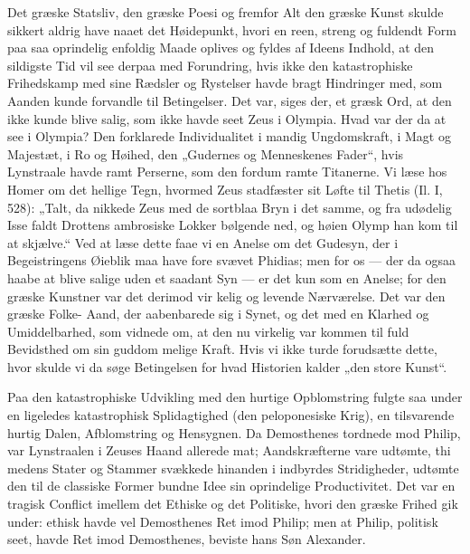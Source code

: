 \documentclass[12pt]{book}
\newcommand{\opage}[1]{\marginnote{\footnotesize\textit{[#1]}}}
\begin{document}
Det græske Statsliv, den græske Poesi og fremfor
Alt den græske Kunst skulde sikkert aldrig have naaet
det Høidepunkt, hvori en reen, streng og fuldendt Form
paa saa oprindelig enfoldig Maade oplives og fyldes af
Ideens Indhold, at den sildigste Tid vil see derpaa med
Forundring, hvis ikke den katastrophiske Frihedskamp
med sine Rædsler og Rystelser havde bragt Hindringer
med, som Aanden kunde forvandle til Betingelser. Det
var, siges der, et græsk Ord, at den ikke kunde blive
salig, som ikke havde seet Zeus i Olympia. Hvad var
der da at see i Olympia? Den forklarede Individualitet
i mandig Ungdomskraft, i Magt og Majestæt, i Ro og
Høihed, den „Gudernes og Menneskenes Fader“, hvis
Lynstraale havde ramt Perserne, som den fordum ramte
Titanerne. Vi læse hos Homer om det hellige Tegn,
hvormed Zeus stadfæster sit Løfte til Thetis (Il. I, 528):
„Talt, da nikkede Zeus med de sortblaa Bryn i det
samme, og fra udødelig Isse faldt Drottens ambrosiske
Lokker bølgende ned, og høien Olymp han kom til at
skjælve.“ Ved at læse dette faae vi en Anelse om det
Gudesyn, der i Begeistringens Øieblik maa have fore\-%
svævet Phidias; men for os --- der da ogsaa haabe at
blive salige uden et saadant Syn --- er det kun som en
Anelse; for den græske Kunstner var det derimod vir\-%
kelig og levende Nærværelse. Det var den græske Folke-%
Aand, der aabenbarede sig i Synet, og det med en
Klarhed og Umiddelbarhed, som vidnede om, at den nu
virkelig var kommen til fuld Bevidsthed om sin guddom\-%
melige Kraft. Hvis vi ikke turde forudsætte dette, hvor
\opage{27}\setcounter{footnote}{0}%
skulde vi da søge Betingelsen for hvad Historien kalder
„den store Kunst“.

Paa den katastrophiske Udvikling med den hurtige
Opblomstring fulgte saa under en ligeledes katastrophisk
Splidagtighed (den peloponesiske Krig), en tilsvarende
hurtig Dalen, Afblomstring og Hensygnen. Da Demosthenes
tordnede mod Philip, var Lynstraalen i Zeuses Haand
allerede mat; Aandskræfterne vare udtømte, thi medens
Stater og Stammer svækkede hinanden i indbyrdes Stridigheder,
udtømte den til de classiske Former bundne
Idee sin oprindelige Productivitet. Det var en tragisk
Conflict imellem det Ethiske og det Politiske, hvori den
græske Frihed gik under: ethisk havde vel Demosthenes
Ret imod Philip; men at Philip, politisk seet, havde Ret
imod Demosthenes, beviste hans Søn Alexander.
\end{document}
